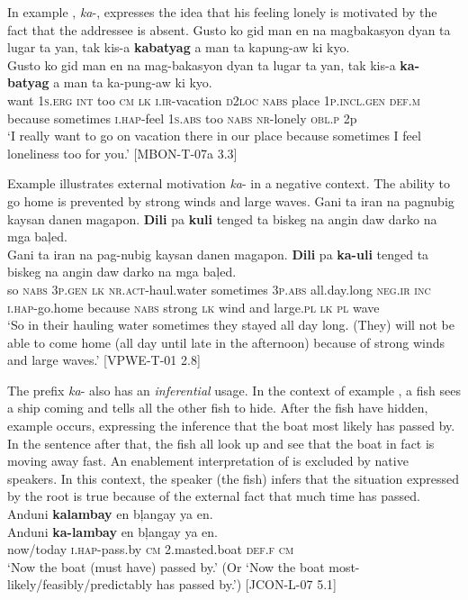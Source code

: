 \z
In example , \textit{ka}{}-, expresses the idea that his feeling lonely is motivated by the fact that the addressee is absent.
\ea
\label{bkm:Ref447898317}
Gusto  ko  gid  man  en  na  magbakasyon  dyan  ta  lugar ta  yan,  tak  kis-a  \textbf{kabatyag}  a  man ta  kapung-aw  ki  kyo. \\\smallskip
 \gll Gusto  ko  gid  man  en  na  mag-bakasyon  dyan  ta  lugar ta  yan,  tak  kis-a  \textbf{ka-batyag}  a  man ta  ka-pung-aw  ki  kyo. \\
want  1\textsc{s.erg}  \textsc{int}  too  \textsc{cm}  \textsc{lk}  \textsc{i.ir}-vacation  \textsc{d}2\textsc{loc}  \textsc{nabs}  place
1\textsc{p.incl.gen}  \textsc{def.m} because  sometimes  \textsc{i.hap}-feel  1\textsc{s.abs} too
\textsc{nabs}  \textsc{nr}-lonely  \textsc{obl.p}  2p \\
\glt `I really want to go on vacation there in our place because sometimes I feel loneliness too for you.’ [MBON-T-07a 3.3]
\z

Example  illustrates external motivation \textit{ka}- in a negative context. The ability to go home is prevented by strong winds and large waves.
\ea
\label{bkm:Ref120018997}
Gani  ta  iran  na  pagnubig  kaysan  danen magapon. \textbf{Dili}  pa  \textbf{kuli}  tenged  ta  biskeg na  angin  daw  darko  na mga  baļed. \\\smallskip
 \gll Gani  ta  iran  na  pag-nubig  kaysan  danen magapon. \textbf{Dili}  pa  \textbf{ka-uli}  tenged  ta  biskeg na  angin  daw  darko  na mga  baļed. \\
so  \textsc{nabs} 3\textsc{p.gen}  \textsc{lk}  \textsc{nr.act}-haul.water  sometimes  3\textsc{p.abs}
all.day.long
 \textsc{neg.ir}  \textsc{inc}  \textsc{i.hap}-go.home  because  \textsc{nabs} strong
\textsc{lk} wind  and  large.\textsc{pl}  \textsc{lk} \textsc{pl}  wave \\
\glt `So in their hauling water sometimes they stayed all day long. (They) will not be able to come home (all day until late in the afternoon) because of strong winds and large waves.’ [VPWE-T-01 2.8]
\z

The prefix \textit{ka}- also has an \textit{inferential} usage. In the context of example , a fish sees a ship coming and tells all the other fish to hide. After the fish have hidden, example  occurs, expressing the inference that the boat most likely has passed by. In the sentence after that, the fish all look up and see that the boat in fact is moving away fast. An enablement interpretation of  is excluded by native speakers. In this context, the speaker (the fish) infers that the situation expressed by the root is true because of the external fact that much time has passed.
\ea
\label{bkm:Ref447986985}
Anduni  \textbf{kalambay}  en  bļangay  ya  en. \\\smallskip
 \gll Anduni  \textbf{ka-lambay}  en  bļangay  ya  en. \\
now/today  \textsc{i.hap}-pass.by  \textsc{cm} 2.masted.boat  \textsc{def.f}  \textsc{cm} \\
\glt ‘Now the boat (must have) passed by.’ (Or ‘Now the boat most-likely/feasibly/predictably has passed by.’) [JCON-L-07 5.1]
\z

